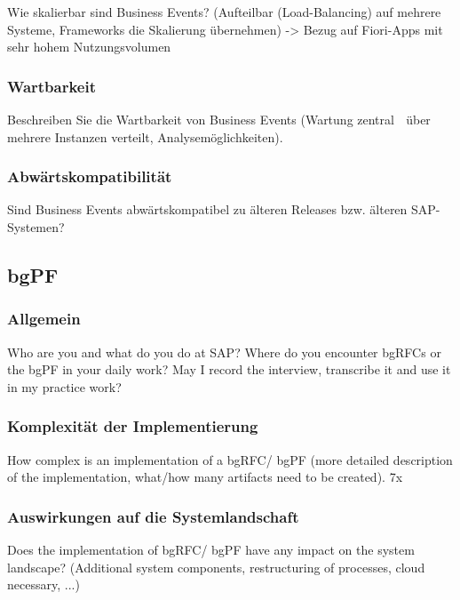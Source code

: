 Wie skalierbar sind Business Events? (Aufteilbar (Load-Balancing) auf mehrere Systeme, Frameworks die Skalierung übernehmen) -> Bezug auf Fiori-Apps mit sehr hohem Nutzungsvolumen

\subsubsection{Wartbarkeit}

Beschreiben Sie die Wartbarkeit von Business Events (Wartung zentral  über mehrere Instanzen verteilt, Analysemöglichkeiten). 

\subsubsection{Abwärtskompatibilität}

Sind Business Events abwärtskompatibel zu älteren Releases bzw. älteren SAP-Systemen?

\subsection*{bgPF} \label{FB_bgPF}

\subsubsection{Allgemein}

Who are you and what do you do at SAP? \newline
Where do you encounter bgRFCs or the bgPF in your daily work? \newline
May I record the interview, transcribe it and use it in my practice work?

\subsubsection{Komplexität der Implementierung}

How complex is an implementation of a bgRFC/ bgPF (more detailed description of the implementation, what/how many artifacts need to be created).
7x
\subsubsection{Auswirkungen auf die Systemlandschaft}

Does the implementation of bgRFC/ bgPF have any impact on the system landscape? (Additional system components, restructuring of processes, cloud necessary, ...)

